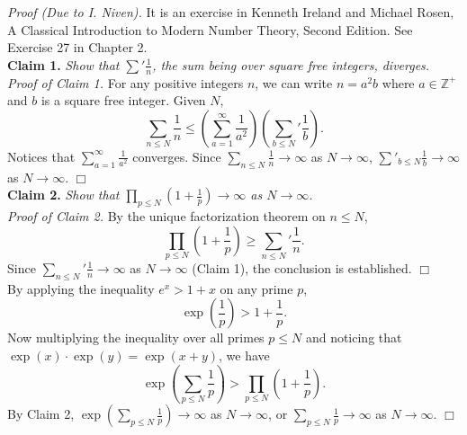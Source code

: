 \documentclass{article}
\begin{document}
\emph{Proof (Due to I. Niven).}
It is an exercise in Kenneth Ireland and Michael Rosen,
A Classical Introduction to Modern Number Theory, Second Edition. See Exercise 27 in Chapter 2. \\

\textbf{Claim 1.}
\emph{Show that ${\sum}' \frac{1}{n}$, the sum being over square free integers, diverges.} \\
\emph{Proof of Claim 1.}
For any positive integers $n$, we can write $n = a^2 b$ where $a \in \mathbb{Z}^+$ and
$b$ is a square free integer.
Given $N$,
$$\sum_{n \leq N} \frac{1}{n}
\leq \left(\sum_{a = 1}^{\infty} \frac{1}{a^2} \right)
\left( {\sum_{b \leq N}}' \frac{1}{b} \right).$$
Notices that $\sum_{a = 1}^{\infty} \frac{1}{a^2}$ converges.
Since $\sum_{n \leq N} \frac{1}{n} \rightarrow \infty$ as $N \rightarrow \infty$,
$\sum'_{b \leq N}\frac{1}{b} \rightarrow \infty$ as $N \rightarrow \infty$.
$\Box$ \\

\textbf{Claim 2.}
\emph{Show that
$\prod_{p \leq N} ( 1 + \frac{1}{p} ) \rightarrow \infty$ as $N \rightarrow \infty$.} \\
\emph{Proof of Claim 2.}
By the unique factorization theorem on $n \leq N$,
$$\prod_{p \leq N} \left( 1 + \frac{1}{p} \right)
\geq {\sum_{n \leq N}}' \frac{1}{n}.$$
Since ${\sum_{n \leq N}}' \frac{1}{n} \rightarrow \infty$ as $N \rightarrow \infty$ (Claim 1),
the conclusion is established.
$\Box$ \\

By applying the inequality $e^x > 1 + x$ on any prime $p$,
$$\exp\left(\frac{1}{p}\right) > 1 + \frac{1}{p}.$$
Now multiplying the inequality over all primes $p \leq N$ and noticing that
$\exp(x) \cdot \exp(y) = \exp(x + y)$, we have
$$\exp\left(\sum_{p \leq N} \frac{1}{p} \right)
> \prod_{p \leq N} \left( 1 + \frac{1}{p} \right).$$
By Claim 2,
$\exp\left(\sum_{p \leq N} \frac{1}{p} \right) \rightarrow \infty$ as $N \rightarrow \infty$, or
$\sum_{p \leq N} \frac{1}{p} \rightarrow \infty$ as $N \rightarrow \infty$.
$\Box$ \\
\end{document}
